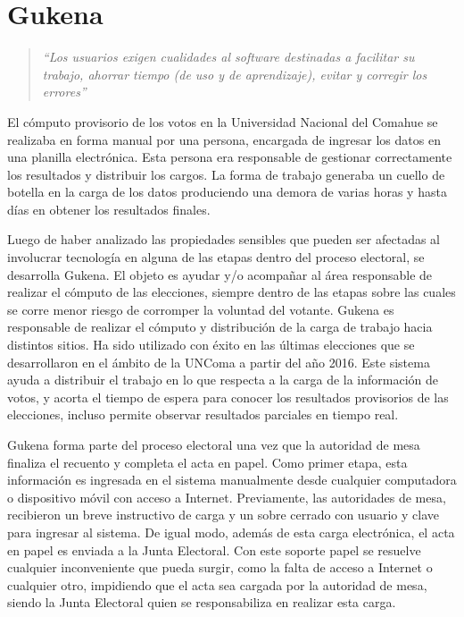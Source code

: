 \chapter{Gukena}
\label{Gukena}

\begin{quote}\textit{``Los usuarios exigen cualidades al software destinadas a facilitar su trabajo, ahorrar tiempo (de uso y de aprendizaje), evitar y corregir los errores''} \cite{definicionUsuarioInterfaz}\end{quote} 
El cómputo provisorio de los votos en la Universidad Nacional del Comahue se realizaba en forma manual por una persona, encargada de ingresar los datos en una planilla electrónica. Esta persona era responsable de gestionar correctamente los resultados y distribuir los cargos. La forma de trabajo generaba un cuello de botella en la carga de los datos produciendo una demora de varias horas y hasta días en obtener los resultados finales.

Luego de haber analizado las propiedades sensibles que pueden ser afectadas al involucrar tecnología en alguna de las etapas dentro del proceso electoral, se desarrolla Gukena. El objeto es ayudar y/o 
acompañar al área responsable de realizar el cómputo de las elecciones, siempre dentro de las etapas sobre las cuales se corre menor riesgo de corromper la voluntad del votante. Gukena es responsable de realizar el cómputo y distribución de la carga de trabajo hacia distintos sitios. Ha sido utilizado con éxito en las últimas elecciones que se desarrollaron en el ámbito de la UNComa a partir del año 2016. Este sistema ayuda a distribuir el trabajo en lo que respecta a la carga de la información de votos, y acorta el tiempo de espera para conocer los resultados provisorios de las elecciones, incluso permite observar resultados parciales en tiempo real.\newline

Gukena forma parte del proceso electoral una vez que la autoridad de mesa finaliza el recuento y completa el acta en papel. Como primer etapa, esta información es ingresada en el sistema manualmente desde cualquier computadora o dispositivo móvil con acceso a Internet. Previamente, las autoridades de mesa, recibieron un breve instructivo de carga y un sobre cerrado con usuario y clave para ingresar al sistema. De igual modo, además de esta carga electrónica, el acta en papel es enviada a la Junta Electoral. Con este soporte papel se resuelve cualquier inconveniente que pueda surgir, como la falta de acceso a Internet o cualquier otro,  impidiendo que el acta sea cargada por la autoridad de mesa, siendo la Junta Electoral quien se responsabiliza en realizar esta carga.

